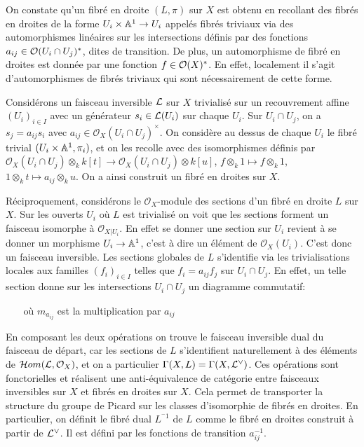 On constate qu'un fibré en droite $(L,\pi)$ sur $X$ est obtenu en recollant des fibrés en droites de la forme $U_i\times \mathbb{A}^1\rightarrow U_i$ appelés fibrés triviaux via des automorphismes linéaires sur les intersections définis par des fonctions $a_{ij}\in \mathcal{O}(U_i\cap U_j)^*$, dites de transition. De plus, un automorphisme de fibré en droites est donnée par une fonction $f\in \mathcal{O}(X)^*$. En effet, localement il s'agit d'automorphismes de fibrés triviaux qui sont nécessairement de cette forme.

Considérons un faisceau inversible $\mathcal{L}$ sur $X$ trivialisé sur un recouvrement affine $(U_i)_{i\in I}$ avec un générateur $s_i\in\mathcal{L}(U_i)$ sur chaque $U_i$. Sur $U_i\cap U_j$, on a $s_j=a_{ij}s_i$ avec $a_{ij} \in \mathcal{O}_X(U_i\cap U_j)^\times$. On considère au dessus de chaque $U_i$ le fibré trivial $(U_i\times\mathbb{A}^1, \pi_i)$, et on les recolle avec des isomorphismes définis par $\mathcal{O}_X(U_i\cap U_j)\otimes_k k[t]\rightarrow \mathcal{O}_X(U_i\cap U_j)\otimes k[u]$, $f\otimes_k 1\mapsto f\otimes_k 1$, $1 \otimes_k t \mapsto a_{ij}\otimes_k u$. On a ainsi construit un fibré en droites sur $X$.

Réciproquement, considérons le $\mathcal{O}_X$-module des sections d'un fibré en droite $L$ sur $X$. Sur les ouverts $U_i$ où $L$ est trivialisé on voit que les sections forment un faisceau isomorphe à $\mathcal{O}_{X|U_i}$. En effet se donner une section sur $U_i$ revient à se donner un morphisme $U_i\rightarrow \mathbb{A}^1$, c'est à dire un élément de $\mathcal{O}_X(U_i)$. C'est donc un faisceau inversible. Les sections globales de $L$ s'identifie via les trivialisations locales aux familles $(f_i)_{i\in I}$ telles que $f_i=a_{ij}f_j$ sur $U_i\cap U_j$. En effet, un telle section donne sur les intersections $U_i\cap U_j$ un diagramme commutatif:

	\begin{center}
	$\,\,\,\,\,\,\,\,\,$ où $m_{a_{ij}}$ est la multiplication par $a_{ij}$ 
	\end{center}

En composant les deux opérations on trouve le faisceau inversible dual du faisceau de départ, car les sections de $L$ s'identifient naturellement à des éléments de $\mathcal{H} om(\mathcal{L},\mathcal{O}_X)$, et on a particulier $\Gamma(X,L)=\Gamma(X,\mathcal{L}^\vee)$. Ces opérations sont fonctorielles et réalisent une anti-équivalence de catégorie entre faisceaux inversibles sur $X$ et fibrés en droites sur $X$. Cela permet de transporter la structure du groupe de Picard sur les classes d'isomorphie de fibrés en droites. En particulier, on définit le fibré dual $L^{^-1}$ de $L$ comme le fibré en droites construit à partir de $\mathcal{L}^\vee$. Il est défini par les fonctions de transition $a_{ij}^{-1}$.

